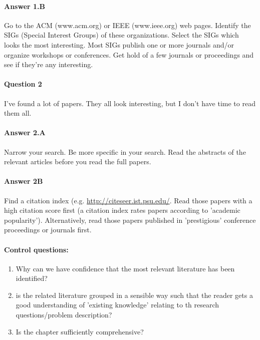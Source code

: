 \paragraph{Answer 1.B}  Go to the ACM (www.acm.org) or IEEE (www.ieee.org) web pages.
Identify the SIGs (Special Interest Groups) of these organizations.
Select the SIGs which looks the most interesting.
Most SIGs publish one or more journals and/or organize workshops or conferences.
Get hold of a few journals or proceedings and see if they're any interesting.


\paragraph{Question 2}  I've found a lot of papers.
They all look interesting, but I don't have time to read them all.

\paragraph{Answer 2.A}  Narrow your search.  Be more specific in your search.  Read the abstracts of the relevant articles before you read the full papers.

\paragraph{Answer 2B}  Find a citation index (e.g. \url{http://citeseer.ist.psu.edu/}.
Read those papers with a high citation score first
(a citation index rates papers according to 'academic popularity').  Alternatively,
read those papers published in 'prestigious' conference proceedings or journals first.


\paragraph{Control questions:}
\begin{enumerate}
\item Why can we have confidence that the most relevant literature has been identified?
\item is the related literature grouped in a sensible way such that the reader gets a good understanding of 'existing knowledge' relating to th research questions/problem description?
\item Is the chapter sufficiently comprehensive?
\end{enumerate}

